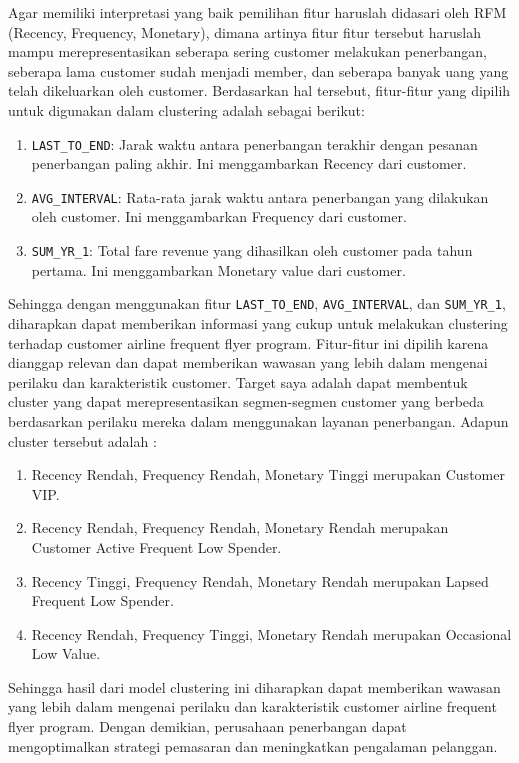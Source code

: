 Agar memiliki interpretasi yang baik pemilihan fitur haruslah didasari oleh RFM (Recency, Frequency, Monetary), dimana artinya fitur fitur tersebut haruslah mampu merepresentasikan seberapa sering customer melakukan penerbangan, seberapa lama customer sudah menjadi member, dan seberapa banyak uang yang telah dikeluarkan oleh customer. Berdasarkan hal tersebut, fitur-fitur yang dipilih untuk digunakan dalam clustering adalah sebagai berikut:

\begin{enumerate}
    \item \texttt{LAST\_TO\_END}: Jarak waktu antara penerbangan terakhir dengan pesanan penerbangan paling akhir. Ini menggambarkan Recency dari customer.
    \item \texttt{AVG\_INTERVAL}: Rata-rata jarak waktu antara penerbangan yang dilakukan oleh customer. Ini menggambarkan Frequency dari customer.
    \item \texttt{SUM\_YR\_1}: Total fare revenue yang dihasilkan oleh customer pada tahun pertama. Ini menggambarkan Monetary value dari customer.
\end{enumerate}

Sehingga dengan menggunakan fitur \texttt{LAST\_TO\_END}, \texttt{AVG\_INTERVAL}, dan \texttt{SUM\_YR\_1}, diharapkan dapat memberikan informasi yang cukup untuk melakukan clustering terhadap customer airline frequent flyer program. Fitur-fitur ini dipilih karena dianggap relevan dan dapat memberikan wawasan yang lebih dalam mengenai perilaku dan karakteristik customer. Target saya adalah dapat membentuk cluster yang dapat merepresentasikan segmen-segmen customer yang berbeda berdasarkan perilaku mereka dalam menggunakan layanan penerbangan. Adapun cluster tersebut adalah :

\begin{enumerate}
    \item Recency Rendah, Frequency Rendah, Monetary Tinggi merupakan Customer VIP.
    \item Recency Rendah, Frequency Rendah, Monetary Rendah merupakan Customer Active Frequent Low Spender.
    \item Recency Tinggi, Frequency Rendah, Monetary Rendah merupakan Lapsed Frequent Low Spender.
    \item Recency Rendah, Frequency Tinggi, Monetary Rendah merupakan Occasional Low Value.
\end{enumerate}

Sehingga hasil dari model clustering ini diharapkan dapat memberikan wawasan yang lebih dalam mengenai perilaku dan karakteristik customer airline frequent flyer program. Dengan demikian, perusahaan penerbangan dapat mengoptimalkan strategi pemasaran dan meningkatkan pengalaman pelanggan.

